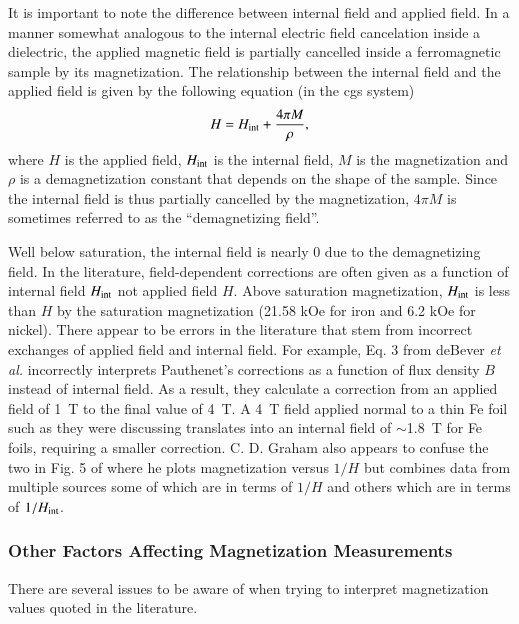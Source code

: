 \documentclass[preprint,12pt]{elsarticle}
\begin{document}
It is important to note the difference between internal field and applied field. In a manner somewhat analogous to the internal electric field cancelation inside a dielectric, the applied magnetic field is partially cancelled inside a ferromagnetic sample by its magnetization. The relationship between the internal field and the applied field is given by the following equation (in the cgs system)
\begin{equation}
H=H_{\rm int}+\frac{4\pi M}{\rho},
\label{eq:Hint}
\end{equation}
where $H$ is the applied field, $H_{\rm int}$ is the internal field, $M$ is the magnetization and $\rho$ is a demagnetization constant that depends on the shape of the sample. Since the internal field is thus partially cancelled by the magnetization, $4\pi M$ is sometimes referred to as the ``demagnetizing field''. 

Well below saturation, the internal field is nearly 0 due to the demagnetizing field. In the literature, field-dependent corrections are often given as a function of internal field $H_{\rm int}$ not applied field $H$. Above saturation magnetization, $H_{\rm int}$ is less than $H$ by the saturation magnetization (21.58 kOe for iron and 6.2 kOe for nickel). There appear to be errors in the literature that stem from incorrect exchanges of applied field and internal field. For example, Eq. 3 from deBever {\it et al.} incorrectly interprets Pauthenet's corrections as a function of flux density $B$ instead of internal field. As a result, they calculate a correction from an applied field of 1~T to the final value of 4~T. A 4~T field applied normal to a thin Fe foil such as they were discussing translates into an internal field of $\sim$1.8~T for Fe foils, requiring a smaller correction. C. D. Graham also appears to confuse the two in Fig. 5  of \cite{Graham1982} where he plots magnetization versus $1/H$ but combines data from multiple sources some of which are in terms of $1/H$ and others which are in terms of $1/H_{\rm int}$.  

\subsubsection{\label{sec:other_factors}Other Factors Affecting Magnetization Measurements}
There are several issues to be aware of when trying to interpret magnetization values quoted in the literature.
\end{document}
